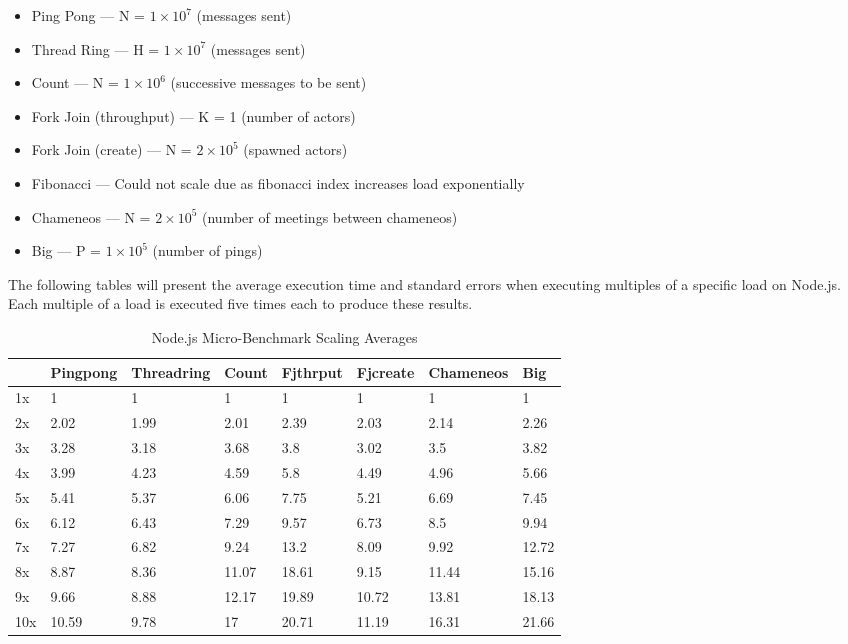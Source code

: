 \documentclass[oneside]{um-fict}
\begin{document}
\begin{itemize}
    \item Ping Pong --- N = $1\times10^7$ (messages sent)
    \item Thread Ring --- H = $1\times10^7$ (messages sent)
    \item Count --- N = $1\times10^6$ (successive messages to be sent)
    \item Fork Join (throughput) --- K = 1 (number of actors)
    \item Fork Join (create) --- N = $2\times10^5$ (spawned actors)
    \item Fibonacci --- Could not scale due as fibonacci index increases load exponentially 
    \item Chameneos --- N = $2\times10^5$ (number of meetings between chameneos)
    \item Big --- P = $1\times10^5$ (number of pings) 
\end{itemize}

The following tables will present the average execution time and standard errors when executing multiples of a specific load on Node.js. Each multiple of a load is executed five times each to produce these results.
\begin{table}[H]
    \begin{center}
        \begin{tabular}{|l|lllllll|}
        \hline
        & Pingpong & Threadring & Count & Fjthrput & Fjcreate & Chameneos  & Big   \\ \hline
        1x & 1        & 1          & 1     & 1        & 1        & 1     & 1     \\
        2x & 2.02     & 1.99       & 2.01  & 2.39     & 2.03     & 2.14  & 2.26  \\
        3x  & 3.28     & 3.18       & 3.68  & 3.8      & 3.02     & 3.5   & 3.82  \\
        4x & 3.99     & 4.23       & 4.59  & 5.8      & 4.49     & 4.96  & 5.66  \\
        5x  & 5.41     & 5.37       & 6.06  & 7.75     & 5.21     & 6.69  & 7.45  \\
        6x & 6.12     & 6.43       & 7.29  & 9.57     & 6.73     & 8.5   & 9.94  \\
        7x & 7.27     & 6.82       & 9.24  & 13.2     & 8.09     & 9.92  & 12.72 \\
        8x & 8.87     & 8.36       & 11.07 & 18.61    & 9.15     & 11.44 & 15.16 \\
        9x & 9.66     & 8.88       & 12.17 & 19.89    & 10.72    & 13.81 & 18.13 \\
        10x & 10.59    & 9.78       & 17    & 20.71    & 11.19    & 16.31 & 21.66 \\ \hline
        \end{tabular}
        \caption{Node.js Micro-Benchmark Scaling Averages}\label{tab:nodeloadscalingavg}
    \end{center}
\end{table}
\end{document}
